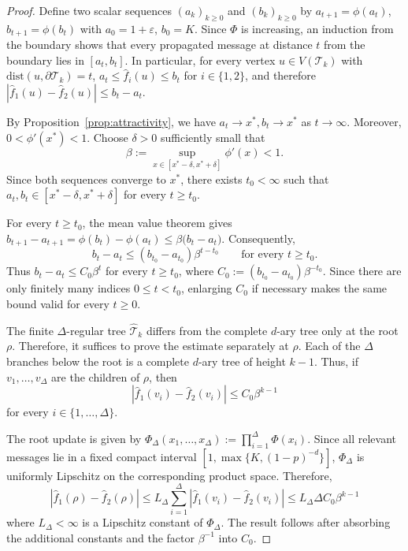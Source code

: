 \documentclass[11pt]{amsart}
\theoremstyle{plain}
\theoremstyle{definition}
\theoremstyle{remark}
\newcommand{\dist}{\mathrm{dist}}
\begin{document}
\begin{proof}
Define two scalar sequences $(a_k)_{k\ge0}$ and $(b_k)_{k\ge0}$ by $a_{t+1}=\phi(a_t)$, $b_{t+1}=\phi(b_t)$ with $a_0=1+\varepsilon$, $b_0=K$. Since $\Phi$ is increasing, an induction from the boundary shows that every propagated message at distance $t$ from the boundary lies in $[a_t,b_t]$. In particular, for every vertex $u\in V(\mathcal T_k)$ with $\dist(u,\partial\mathcal T_k)=t$, $a_t\le\widehat f_i(u)\le b_t$ for $i\in\{1,2\}$, and therefore $\left|\widehat f_1(u)-\widehat f_2(u)\right|\le b_t-a_t$.

By Proposition~\ref{prop:attractivity}, we have $a_t\to x^*, b_t\to x^*$ as $t\to\infty$. Moreover, $0<\phi'(x^*)<1$. Choose $\delta>0$ sufficiently small that
\[
    \beta
    :=
    \sup_{x\in[x^*-\delta,x^*+\delta]}
    \phi'(x)
    <1.
\]
Since both sequences converge to $x^*$, there exists $t_0<\infty$ such that $a_t,b_t \in [x^*-\delta,x^*+\delta]$ for every $t\ge t_0$.

For every $t\ge t_0$, the mean value theorem gives $b_{t+1}-a_{t+1}=\phi(b_t)-\phi(a_t)\le\beta\bigl(b_t-a_t\bigr)$. Consequently,
\[
    b_t-a_t
    \le
    (b_{t_0}-a_{t_0})\beta^{t-t_0}
    \qquad
    \text{for every }t\ge t_0.
\]
Thus $b_t-a_t\le C_0\beta^t$ for every $t\ge t_0$, where $C_0:=(b_{t_0}-a_{t_0})\beta^{-t_0}$. Since there are only finitely many indices $0\le t<t_0$, enlarging $C_0$ if necessary makes the same bound valid for every $t\ge0$.

The finite $\Delta$-regular tree $\widehat{\mathcal T}_k$ differs from the complete $d$-ary tree only at the root $\rho$. Therefore, it suffices to prove the estimate separately at $\rho$. Each of the $\Delta$ branches below the root is a complete $d$-ary tree of height $k-1$. Thus, if $v_1,\ldots,v_\Delta$ are the children of $\rho$, then
\[
    \left|
        \widehat f_1(v_i)-\widehat f_2(v_i)
    \right|
    \le
    C_0\beta^{k-1}
\]
for every $i\in\{1,\ldots,\Delta\}$.

The root update is given by $\Phi_\Delta(x_1,\ldots,x_\Delta):=\prod_{i=1}^{\Delta}\Phi(x_i)$. Since all relevant messages lie in a fixed compact interval $\left[1, \max\{K, (1-p)^{-d}\}\right]$, $\Phi_\Delta$ is uniformly Lipschitz on the corresponding product
space. Therefore,
\[
    \left|
        \widehat f_1(\rho)-\widehat f_2(\rho)
    \right|
    \le
    L_\Delta
    \sum_{i=1}^{\Delta}
    \left|
        \widehat f_1(v_i)-\widehat f_2(v_i)
    \right|
    \le
    L_\Delta\Delta C_0\beta^{k-1}
\]
where $L_\Delta<\infty$ is a Lipschitz constant of $\Phi_\Delta$. The result follows after absorbing the additional constants and the factor $\beta^{-1}$ into $C_0$.
\end{proof}
\end{document}
